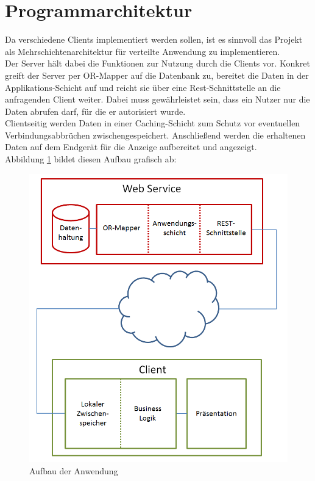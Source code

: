 \section{Programmarchitektur}
\label{sec:programmarchitektur}
Da verschiedene Clients implementiert werden sollen, ist es sinnvoll das Projekt als Mehrschichtenarchitektur für verteilte Anwendung zu implementieren. \\
Der Server hält dabei die Funktionen zur Nutzung durch die Clients vor. Konkret greift der Server per OR-Mapper auf die Datenbank zu, bereitet die Daten in der Applikations-Schicht auf und reicht sie über eine Rest-Schnittstelle an die anfragenden Client weiter. Dabei muss gewährleistet sein, dass ein Nutzer nur die Daten abrufen darf, für die er autorisiert wurde. \\
Clientseitig werden Daten in einer Caching-Schicht zum Schutz vor eventuellen Verbindungsabbrüchen zwischengespeichert. Anschließend werden die erhaltenen Daten auf dem Endgerät für die Anzeige aufbereitet und angezeigt. \\
Abbildung \ref{pic:architecture} bildet diesen Aufbau grafisch ab:
\begin{figure}[h]
\centering
\includegraphics[width=0.8\linewidth]{content/images/Aufbau-Architektur.png}
\caption{Aufbau der Anwendung}
\label{pic:architecture}
\end{figure}
